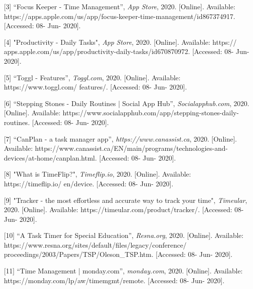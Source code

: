 \documentclass{sigchi}
\begin{document}
[3] ``Focus Keeper - Time Management'', \textit{App Store}, 2020. [Online]. Available: https://apps.apple.com/us/app/focus-keeper-time-management/id867374917. [Accessed: 08- Jun- 2020].

[4] "Productivity - Daily Tasks", \textit{App Store}, 2020. [Online]. Available: https://
apps.apple.com/us/app/productivity-daily-tasks/id670870972. [Accessed: 08- Jun- 2020].

[5] ``Toggl - Features'', \textit{Toggl.com}, 2020. [Online]. Available: https://www.toggl.com/
features/. [Accessed: 08- Jun- 2020].

[6] ``Stepping Stones - Daily Routines | Social App Hub'', \textit{Socialapphub.com}, 2020. [Online]. Available: https://www.socialapphub.com/app/stepping-stones-daily-routines. [Accessed: 08- Jun- 2020].

[7] ``CanPlan - a task manager app'', \textit{https://www.canassist.ca}, 2020. [Online]. Available: https://www.canassist.ca/EN/main/programs/technologies-and-devices/at-home/canplan.html. [Accessed: 08- Jun- 2020].

[8] "What is TimeFlip?", \textit{Timeflip.io}, 2020. [Online]. Available: https://timeflip.io/
en/device. [Accessed: 08- Jun- 2020].

[9] "Tracker - the most effortless and accurate way to track your time", \textit{Timeular}, 2020. [Online]. Available: https://timeular.com/product/tracker/. [Accessed: 08- Jun- 2020].

[10] ``A Task Timer for Special Education'', \textit{Resna.org}, 2020. [Online]. Available: https://www.resna.org/sites/default/files/legacy/conference/
proceedings/2003/Papers/TSP/Oleson\_TSP.htm. [Accessed: 08- Jun- 2020].

[11] ``Time Management | monday.com'', \textit{monday.com}, 2020. [Online]. Available: https://monday.com/lp/aw/timemgmt/remote. [Accessed: 08- Jun- 2020].
\end{document}
